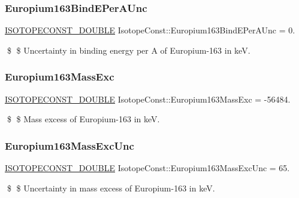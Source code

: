 \subsubsection{\texorpdfstring{Europium163\+Bind\+E\+Per\+A\+Unc}{Europium163BindEPerAUnc}}
{\footnotesize\ttfamily \mbox{\hyperlink{group___isotope_const-_macros_ga8f45a7272ce02c0b4c65c44636ed719a}{I\+S\+O\+T\+O\+P\+E\+C\+O\+N\+S\+T\+\_\+\+D\+O\+U\+B\+LE}} Isotope\+Const\+::\+Europium163\+Bind\+E\+Per\+A\+Unc = 0.}

\$ \$ Uncertainty in binding energy per A of Europium-\/163 in keV. \mbox{\label{group___isotope_const-_europium-_eu163_ga60667f81ad41e4ba953f4bc5c3a35f8c}} 
\subsubsection{\texorpdfstring{Europium163\+Mass\+Exc}{Europium163MassExc}}
{\footnotesize\ttfamily \mbox{\hyperlink{group___isotope_const-_macros_ga8f45a7272ce02c0b4c65c44636ed719a}{I\+S\+O\+T\+O\+P\+E\+C\+O\+N\+S\+T\+\_\+\+D\+O\+U\+B\+LE}} Isotope\+Const\+::\+Europium163\+Mass\+Exc = -\/56484.}

\$ \$ Mass excess of Europium-\/163 in keV. \mbox{\label{group___isotope_const-_europium-_eu163_ga708b5f1d45a84121e6561bd4315160dd}} 
\subsubsection{\texorpdfstring{Europium163\+Mass\+Exc\+Unc}{Europium163MassExcUnc}}
{\footnotesize\ttfamily \mbox{\hyperlink{group___isotope_const-_macros_ga8f45a7272ce02c0b4c65c44636ed719a}{I\+S\+O\+T\+O\+P\+E\+C\+O\+N\+S\+T\+\_\+\+D\+O\+U\+B\+LE}} Isotope\+Const\+::\+Europium163\+Mass\+Exc\+Unc = 65.}

\$ \$ Uncertainty in mass excess of Europium-\/163 in keV. \mbox{\label{group___isotope_const-_europium-_eu163_ga6e3cd88b04f7fb16af1be230095a61fb}} 
